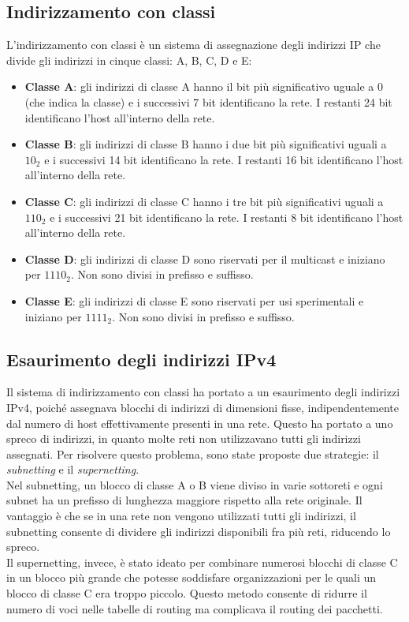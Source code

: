 \documentclass[12pt]{report}
\begin{document}
\subsection{Indirizzamento con classi}
L'indirizzamento con classi è un sistema di assegnazione degli indirizzi IP che divide gli indirizzi in cinque classi: A, B, C, D e E:
\begin{itemize}
	\item \textbf{Classe A}: gli indirizzi di classe A hanno il bit più significativo uguale a 0 (che indica la classe) e i successivi 7 bit identificano la rete. I restanti 24 bit identificano l'host all'interno della rete.
	\item \textbf{Classe B}: gli indirizzi di classe B hanno i due bit più significativi uguali a $10_2$ e i successivi 14 bit identificano la rete. I restanti 16 bit identificano l'host all'interno della rete.
	\item \textbf{Classe C}: gli indirizzi di classe C hanno i tre bit più significativi uguali a $110_2$ e i successivi 21 bit identificano la rete. I restanti 8 bit identificano l'host all'interno della rete.
	\item \textbf{Classe D}: gli indirizzi di classe D sono riservati per il multicast e iniziano per $1110_2$. Non sono divisi in prefisso e suffisso.
	\item \textbf{Classe E}: gli indirizzi di classe E sono riservati per usi sperimentali e iniziano per $1111_2$. Non sono divisi in prefisso e suffisso.
\end{itemize}

\subsection{Esaurimento degli indirizzi IPv4}
Il sistema di indirizzamento con classi ha portato a un esaurimento degli indirizzi IPv4, poiché assegnava blocchi di indirizzi di dimensioni fisse, indipendentemente dal numero di host effettivamente presenti in una rete. Questo ha portato a uno spreco di indirizzi, in quanto molte reti non utilizzavano tutti gli indirizzi assegnati. Per risolvere questo problema, sono state proposte due strategie: il \textit{subnetting} e il \textit{supernetting}.
\vspace{\baselineskip}\\
Nel subnetting, un blocco di classe A o B viene diviso in varie sottoreti e ogni subnet ha un prefisso di lunghezza maggiore rispetto alla rete originale. Il vantaggio è che se in una rete non vengono utilizzati tutti gli indirizzi, il subnetting consente di dividere gli indirizzi disponibili fra più reti, riducendo lo spreco.
\vspace{\baselineskip}\\
Il supernetting, invece, è stato ideato per combinare numerosi blocchi di classe C in un blocco più grande che potesse soddisfare organizzazioni per le quali un blocco di classe C era troppo piccolo. Questo metodo consente di ridurre il numero di voci nelle tabelle di routing ma complicava il routing dei pacchetti.
\end{document}
